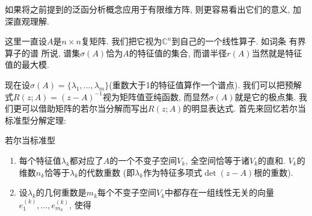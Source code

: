 

如果将之前提到的泛函分析概念应用于有限维方阵, 则更容易看出它们的意义, 加深直观理解. 

这里一直设$A$是$n\times n$复矩阵. 我们把它视为$\mathbb{C}^n$到自己的一个线性算子. 如词条 有界算子的谱 所说, 谱集$\sigma(A)$恰为$A$的特征值的集合, 而谱半径$r(A)$当然就是特征值的最大模. 

现在设$\sigma(A)=\{\lambda_1,...,\lambda_m\}$(重数大于1的特征值算作一个谱点). 我们可以把预解式$R(z;A)=(z-A)^{-1}$视为矩阵值亚纯函数, 而显然$\sigma(A)$就是它的极点集. 我们更可以借助矩阵的若尔当分解而写出$R(z;A)$的明显表达式. 首先来回忆若尔当标准型分解定理:

\begin{theorem}{若尔当标准型}
\begin{enumerate}
\item 每个特征值$\lambda_k$都对应了$A$的一个不变子空间$V_k$, 全空间恰等于诸$V_k$的直和. $V_k$的维数$n_k$恰等于$\lambda_k$的代数重数 (即$\lambda_k$作为特征多项式$\det(z-A)$根的重数).
\item 设$\lambda_k$的几何重数是$m_k$每个不变子空间$V_k$中都存在一组线性无关的向量$e^{(k)}_1,...,e^{(k)}_{m_k}$, 使得
\end{enumerate}
\end{theorem}